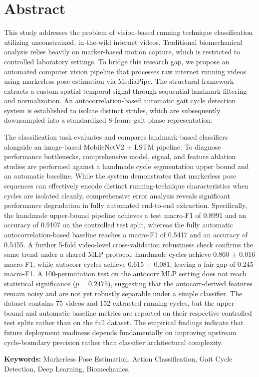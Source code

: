 \chapter*{Abstract}

This study addresses the problem of vision-based running technique classification utilizing unconstrained, in-the-wild internet videos. Traditional biomechanical analysis relies heavily on marker-based motion capture, which is restricted to controlled laboratory settings. To bridge this research gap, we propose an automated computer vision pipeline that processes raw internet running videos using markerless pose estimation via MediaPipe. The structural framework extracts a custom spatial-temporal signal  through sequential landmark filtering and normalization. An autocorrelation-based automatic gait cycle detection system is established to isolate distinct strides, which are subsequently downsampled into a standardized 8-frame gait phase representation.

The classification task evaluates and compares landmark-based classifiers alongside an image-based MobileNetV2 + LSTM pipeline. To diagnose performance bottlenecks, comprehensive model, signal, and feature ablation studies are performed against a handmade cycle segmentation upper bound and an automatic baseline. While the system demonstrates that markerless pose sequences can effectively encode distinct running-technique characteristics when cycles are isolated cleanly, comprehensive error analysis reveals significant performance degradation in fully automated end-to-end extraction. Specifically, the handmade upper-bound pipeline achieves a test macro-F1 of 0.8991 and an accuracy of 0.9107 on the controlled test split, whereas the fully automatic autocorrelation-based baseline reaches a macro-F1 of 0.5417 and an accuracy of 0.5455. A further 5-fold video-level cross-validation robustness check confirms the same trend under a shared MLP protocol: handmade cycles achieve 0.860 $\pm$ 0.016 macro-F1, while autocorr cycles achieve 0.615 $\pm$ 0.081, leaving a fair gap of 0.245 macro-F1. A 100-permutation test on the autocorr MLP setting does not reach statistical significance ($p = 0.2475$), suggesting that the autocorr-derived features remain noisy and are not yet robustly separable under a simple classifier. The dataset contains 75 videos and 152 extracted running cycles, but the upper-bound and automatic baseline metrics are reported on their respective controlled test splits rather than on the full dataset. The empirical findings indicate that future deployment readiness depends fundamentally on improving upstream cycle-boundary precision rather than classifier architectural complexity.

\vspace{1.0cm}
\noindent \textbf{Keywords:} Markerless Pose Estimation, Action Classification, Gait Cycle Detection, Deep Learning, Biomechanics.
